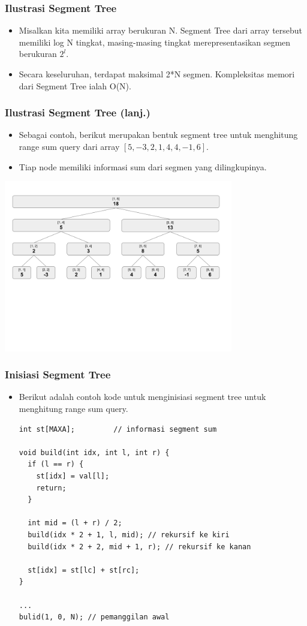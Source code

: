 \begin{frame}
\frametitle{Ilustrasi Segment Tree}
\begin{itemize}
  \item Misalkan kita memiliki array berukuran N. Segment Tree dari array tersebut memiliki log N tingkat, masing-masing tingkat merepresentasikan segmen berukuran $2^l$. 
  \item Secara keseluruhan, terdapat maksimal 2*N segmen. Kompleksitas memori dari Segment Tree ialah O(N).
\end{itemize}
\end{frame}

\begin{frame}
\frametitle{Ilustrasi Segment Tree (lanj.)}
\begin{itemize}
  \item Sebagai contoh, berikut merupakan bentuk segment tree untuk menghitung range sum query dari array $[5, -3, 2, 1, 4, 4, -1, 6]$.
  \item Tiap node memiliki informasi sum dari segmen yang dilingkupinya.
\end{itemize}
\begin{center}
  \includegraphics[width=10cm]{asset/segtree-init.png}
\end{center}
\end{frame}

\begin{frame}[fragile]
\frametitle{Inisiasi Segment Tree}
\begin{itemize}
  \item Berikut adalah contoh kode untuk menginisiasi segment tree untuk menghitung range sum query.
\begin{lstlisting}
int st[MAXA];         // informasi segment sum

void build(int idx, int l, int r) {
  if (l == r) {
    st[idx] = val[l];
    return;
  }

  int mid = (l + r) / 2;
  build(idx * 2 + 1, l, mid); // rekursif ke kiri
  build(idx * 2 + 2, mid + 1, r); // rekursif ke kanan
  
  st[idx] = st[lc] + st[rc];
}

...
bulid(1, 0, N); // pemanggilan awal
\end{lstlisting}
\end{itemize}
\end{frame}




